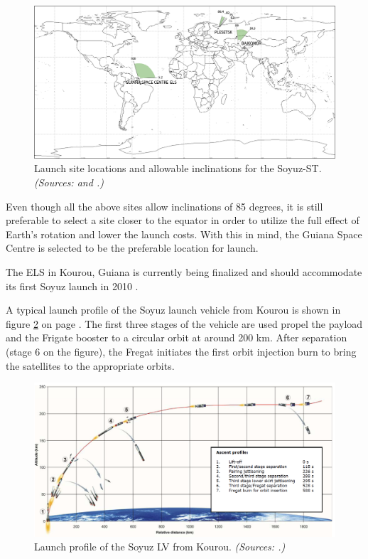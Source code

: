 \begin{figure}[!h]
\centering
\includegraphics[width=1.0\textwidth, angle=0]{chapters/img/launchsites.png}
\caption{Launch site locations and allowable inclinations for the Soyuz-ST. \emph{(Sources: \cite{constDesign} and \cite{rockotman}.)} }
\label{fig:launchsites}
\end{figure}

Even though all the above sites allow inclinations of 85 degrees, it is still preferable to select a site closer to the equator in order to utilize the full effect of Earth's rotation and lower the launch costs. With this in mind, the Guiana Space Centre is selected to be the preferable location for launch.

The \ac{ELS} in Kourou, Guiana is currently being finalized and should accommodate its first Soyuz launch in 2010 \cite{arianesoyuz}.

A typical launch profile of the Soyuz launch vehicle from Kourou is shown in figure \ref{fig:launch} on page \pageref{fig:launch}. The first three stages of the vehicle are used propel the payload and the Frigate booster to a circular orbit at around 200 km. After separation (stage 6 on the figure), the Fregat initiates the first orbit injection burn to bring the satellites to the appropriate orbits.

\begin{figure}[!h]
\centering
\includegraphics[width=1.0\textwidth, angle=0]{chapters/img/launchprofile.png}
\caption{Launch profile of the Soyuz LV from Kourou. \emph{(Sources: \cite{soyuzman}.)} }
\label{fig:launch}
\end{figure}

